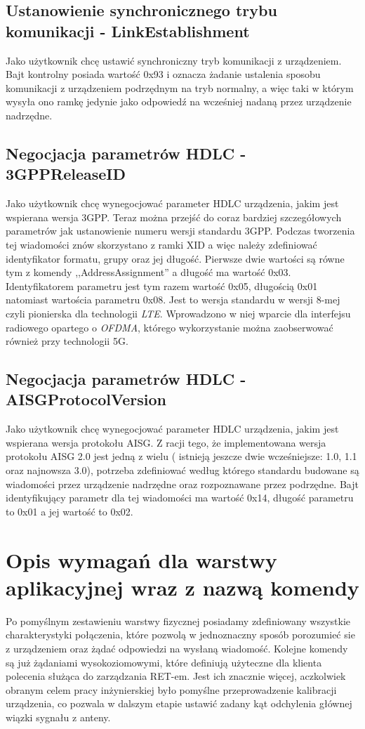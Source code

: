 		\subsection{Ustanowienie synchronicznego trybu komunikacji - LinkEstablishment}
			Jako użytkownik chcę ustawić synchroniczny tryb komunikacji z urządzeniem.
			\newline\newline
			Bajt kontrolny posiada wartość 0x93 i oznacza żadanie ustalenia sposobu komunikacji z urządzeniem podrzędnym na tryb normalny, a więc taki w którym wysyła ono ramkę jedynie jako odpowiedź
			na wcześniej nadaną przez urządzenie nadrzędne.
		 \subsection{Negocjacja parametrów HDLC - 3GPPReleaseID}
			Jako użytkownik chcę wynegocjować parameter HDLC urządzenia, jakim jest wspierana wersja 3GPP.
			\newline\newline
			Teraz można przejść do coraz bardziej szczegółowych parametrów jak ustanowienie numeru wersji standardu 3GPP.
			Podczas tworzenia tej wiadomości znów skorzystano z ramki XID a więc należy zdefiniować identyfikator formatu, grupy oraz jej długość. Pierwsze dwie wartości są równe tym z komendy ,,AddressAssignment'' a długość ma wartość 0x03.
			Identyfikatorem parametru jest tym razem wartość 0x05, długością 0x01 natomiast wartościa parametru 0x08. Jest to wersja standardu w wersji 8-mej czyli pionierska dla technologii \textit{LTE}.
			Wprowadzono w niej wparcie dla interfejsu radiowego opartego o \textit{OFDMA}, którego wykorzystanie można zaobserwować również przy technologii 5G.
		\subsection{Negocjacja parametrów HDLC - AISGProtocolVersion}
			Jako użytkownik chcę wynegocjować parameter HDLC urządzenia, jakim jest wspierana wersja protokołu AISG. \newline
			Z racji tego, że implementowana wersja protokołu AISG 2.0 jest jedną z wielu ( istnieją jeszcze dwie wcześniejsze: 1.0, 1.1 oraz najnowsza 3.0), potrzeba zdefiniować według którego standardu budowane są
			wiadomości przez urządzenie nadrzędne oraz rozpoznawane przez podrzędne.
			Bajt identyfikujący parametr dla tej wiadomości ma wartość 0x14, długość parametru to 0x01 a jej wartość to 0x02.
	\section{Opis wymagań dla warstwy aplikacyjnej wraz z nazwą komendy}
		Po pomyślnym zestawieniu warstwy fizycznej posiadamy zdefiniowany wszystkie charakterystyki połączenia, które pozwolą w jednoznaczny sposób porozumieć sie z urządzeniem oraz żądać odpowiedzi na wysłaną wiadomość.
		Kolejne komendy są już żądaniami wysokoziomowymi, które definiują użyteczne dla klienta polecenia służąca do zarządzania RET-em. Jest ich znacznie więcej, aczkolwiek obranym celem pracy inżynierskiej było pomyślne przeprowadzenie
		kalibracji urządzenia, co pozwala w dalszym etapie ustawić zadany kąt odchylenia głównej wiązki sygnału z anteny.
